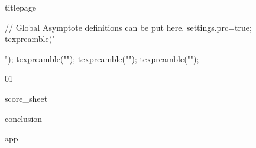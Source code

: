 \documentclass[a4paper,12pt]{article}
\begin{document}
{titlepage}
\clearpage
  \setcounter{page}{2}
  \tableofcontents
\clearpage


\begin{asydef}
// Global Asymptote definitions can be put here.
settings.prc=true;
texpreamble("\usepackage{xltxtra,unicode-math}");
texpreamble("\setmainfont{Times New Roman}");
texpreamble("\setsansfont{Arial}\setmonofont{Courier New}");
texpreamble("");
\end{asydef}

{01}

\clearpage
  {score_sheet}
\clearpage

\clearpage
  {conclusion}
\clearpage

\clearpage
  {app}
\clearpage
\end{document}
